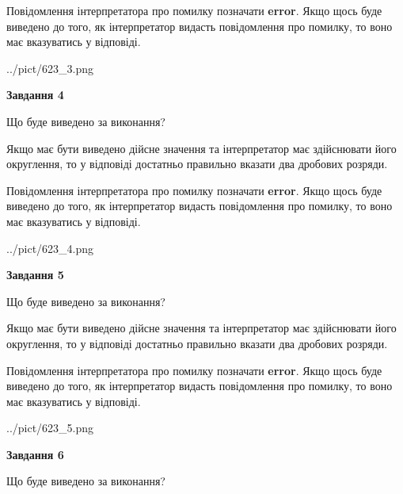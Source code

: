 \documentclass[12pt, ukrainian]{article}
\begin{document}
{\begin {Large}
Повідомлення інтерпретатора про помилку позначати \textbf{error}.
Якщо щось буде виведено до того, як інтерпретатор видасть повідомлення про помилку, 
то воно має вказуватись у відповіді. \par

\begin{center}
	{../pict/623_3.png}
\end{center}
\newpage

{\begin {center}\textbf{Завдання 4}\end {center}}\par
Що буде виведено за виконання? \par

Якщо має бути виведено дійсне значення та інтерпретатор має здійснювати його округлення, 
то у відповіді достатньо правильно вказати два дробових розряди.

Повідомлення інтерпретатора про помилку позначати \textbf{error}.
Якщо щось буде виведено до того, як інтерпретатор видасть повідомлення про помилку, 
то воно має вказуватись у відповіді. \par

\begin{center}
	{../pict/623_4.png}
\end{center}
\newpage

{\begin {center}\textbf{Завдання 5}\end {center}}\par
Що буде виведено за виконання? \par

Якщо має бути виведено дійсне значення та інтерпретатор має здійснювати його округлення, 
то у відповіді достатньо правильно вказати два дробових розряди.

Повідомлення інтерпретатора про помилку позначати \textbf{error}.
Якщо щось буде виведено до того, як інтерпретатор видасть повідомлення про помилку, 
то воно має вказуватись у відповіді. \par

\begin{center}
	{../pict/623_5.png}
\end{center}
\newpage

{\begin {center}\textbf{Завдання 6}\end {center}}\par
Що буде виведено за виконання? \par


\end{Large}}
\end{document}
